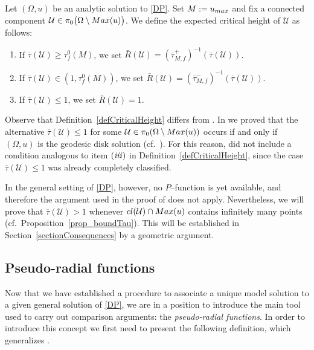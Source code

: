 \documentclass[11pt]{article}
\newcommand{\U}{\mathcal{U}}
\numberwithin{equation} {section}
\begin{document}
\begin{definition}\label{defCriticalHeight}
Let $(\Omega,u)$ be an analytic solution to \eqref{DP}. Set $M:=u_{\textup{max}}$ and fix a connected component $\U\in \pi_0\big(\Omega\setminus \textup{Max}(u)\big)$.
We define the \textup{expected critical height of} $\mathcal U$ as follows:
		\begin{enumerate}
			\item[(i)]  If $\overline{\tau} (\mathcal U) \geq \tau_f^0 (M)$, we set $\bar R(\mathcal U)= (\overline{\tau}_{M,f}^+)^{-1} \left( \overline{\tau} (\mathcal U) \right)$.
		\item[(ii)] If $\overline{\tau} (\mathcal U) \in (1,\tau_f^0 (M))$, we set $ \bar R(\mathcal U)= (\overline{\tau}_{M,f}^-)^{-1} \left( \overline{\tau} (\mathcal U) \right)$.
		
	   \item[(iii)]  If $\overline{\tau} (\mathcal U) \leq 1$, we set $\bar R(\mathcal U)= 1$.
	\end{enumerate}
\end{definition}

Observe that Definition~\ref{defCriticalHeight} differs from \cite[Definition 3.5]{EMa}. In \cite{EMa} we proved that the alternative $\overline{\tau}(\mathcal{U})\le 1$ for some $\mathcal{U}\in \pi_0(\Omega\setminus \textup{Max}(u))$ occurs if and only if $(\Omega,u)$ is the geodesic disk solution (cf.~\cite[Theorem 3.2]{EMa}). For this reason, \cite[Definition 3.5]{EMa} did not include a condition analogous to item ${\it (iii)}$ in Definition~\ref{defCriticalHeight}, since the case $\overline{\tau}(\mathcal{U})\le 1$ was already completely classified.

In the general setting of \eqref{DP}, however, no $P$--function is yet available, and therefore the argument used in the proof of \cite[Theorem 3.2]{EMa} does not apply. Nevertheless, we will prove that $\overline{\tau}(\mathcal{U})>1$ whenever $\textup{cl}(\mathcal{U}) \cap \textup{Max}(u)$ contains infinitely many points (cf.~Proposition~\ref{prop_boundTau}). This will be established in Section~\ref{sectionConsequences} by a geometric argument.

\subsection{Pseudo-radial functions}\label{sectionPseudoRadial}

Now that we have established a procedure to associate a unique model solution to a given general solution of \eqref{DP}, we are in a position to introduce the main tool used to carry out comparison arguments: the \emph{pseudo-radial functions}. In order to introduce this concept we first need to present the following definition, which generalizes \cite[Definition 4.1]{EMa}. 
\end{document}
